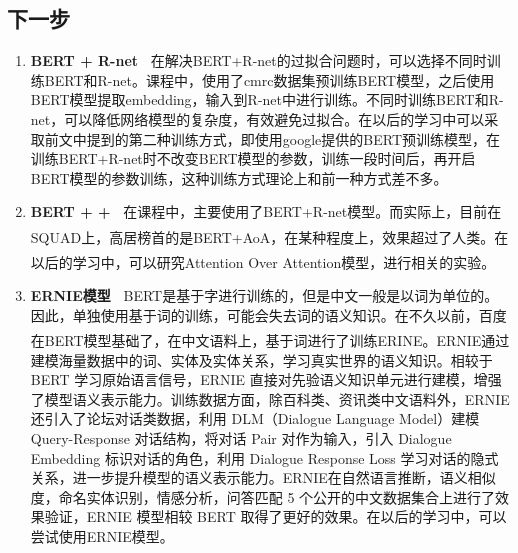 \documentclass[10pt, a4]{extarticle}
\newcommand{\upcite}[1]{\textsuperscript{\textsuperscript{\cite{#1}}}}
\begin{document}
\subsection{下一步}
\begin{enumerate}[fullwidth,itemindent=2em,label=(\arabic*)]
	\item \textbf{BERT + R-net\ } 在解决BERT+R-net的过拟合问题时，可以选择不同时训练BERT和R-net。课程中，使用了cmrc数据集预训练BERT模型，之后使用BERT模型提取embedding，输入到R-net中进行训练。不同时训练BERT和R-net，可以降低网络模型的复杂度，有效避免过拟合。在以后的学习中可以采取前文中提到的第二种训练方式，即使用google提供的BERT预训练模型，在训练BERT+R-net时不改变BERT模型的参数，训练一段时间后，再开启BERT模型的参数训练，这种训练方式理论上和前一种方式差不多。
	\item \textbf{BERT + +\ } 在课程中，主要使用了BERT+R-net模型。而实际上，目前在SQUAD\upcite{squad2.0}上，高居榜首的是BERT+AoA，在某种程度上，效果超过了人类。在以后的学习中，可以研究Attention Over Attention\upcite{cui2016attention}模型，进行相关的实验。
	\item \textbf{ERNIE模型\ } BERT是基于字进行训练的，但是中文一般是以词为单位的。因此，单独使用基于词的训练，可能会失去词的语义知识。在不久以前，百度在BERT模型基础了，在中文语料上，基于词进行了训练ERINE\upcite{ernie}。ERNIE通过建模海量数据中的词、实体及实体关系，学习真实世界的语义知识。相较于 BERT 学习原始语言信号，ERNIE 直接对先验语义知识单元进行建模，增强了模型语义表示能力。训练数据方面，除百科类、资讯类中文语料外，ERNIE 还引入了论坛对话类数据，利用 DLM（Dialogue Language Model）建模 Query-Response 对话结构，将对话 Pair 对作为输入，引入 Dialogue Embedding 标识对话的角色，利用 Dialogue Response Loss 学习对话的隐式关系，进一步提升模型的语义表示能力。ERNIE在自然语言推断，语义相似度，命名实体识别，情感分析，问答匹配 5 个公开的中文数据集合上进行了效果验证，ERNIE 模型相较 BERT 取得了更好的效果。在以后的学习中，可以尝试使用ERNIE模型。
\end{enumerate}

\renewcommand{\refname}{参考文献}

\end{document}
